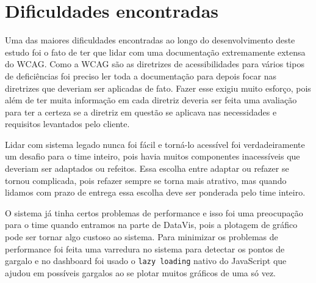 \section{Dificuldades encontradas}
\label{sec:dificuldades}
{
Uma das maiores dificuldades encontradas ao longo do desenvolvimento deste estudo foi o fato de ter que lidar com uma documentação extremamente extensa do WCAG. Como a WCAG são as diretrizes de acessibilidades para vários tipos de deficiências foi preciso ler toda a documentação para depois focar nas diretrizes que deveriam ser aplicadas de fato. Fazer esse exigiu muito esforço, pois além de ter muita informação em cada diretriz deveria ser feita uma avaliação para ter a certeza se a diretriz em questão se aplicava nas necessidades e requisitos levantados pelo cliente.

Lidar com sistema legado nunca foi fácil e torná-lo acessível foi verdadeiramente um desafio para o time inteiro, pois havia muitos componentes inacessíveis que deveriam ser adaptados ou refeitos. Essa escolha entre adaptar ou refazer se tornou complicada, pois refazer sempre se torna mais atrativo, mas quando lidamos com prazo de entrega essa escolha deve ser ponderada pelo time inteiro.

O sistema já tinha certos problemas de performance e isso foi uma preocupação para o time quando entramos na parte de DataVis, pois a plotagem de gráfico pode ser tornar algo custoso ao sistema. Para minimizar os problemas de performance foi feita uma varredura no sistema para detectar os pontos de gargalo e no dashboard foi usado o \lstinline{lazy loading} nativo do JavaScript que ajudou em possíveis gargalos ao se plotar muitos gráficos de uma só vez. 
}

